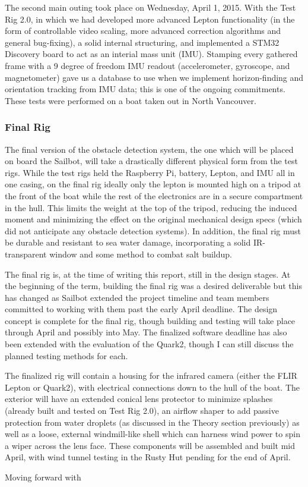 The second main outing took place on Wednesday, April 1, 2015. With the Test Rig 2.0, in which we had developed more advanced Lepton functionality (in the form of controllable video scaling, more advanced correction algorithms and general bug-fixing), a solid internal structuring, and implemented a STM32 Discovery board to act as an interial mass unit (IMU). Stamping every gathered frame with a 9 degree of freedom IMU readout (accelerometer, gyroscope, and magnetometer) gave us a database to use when we implement horizon-finding and orientation tracking from IMU data; this is one of the ongoing commitments. These tests were performed on a boat taken out in North Vancouver.


\subsubsection{\label{sec:discussion:testing:testrig3}Final Rig}
The final version of the obstacle detection system, the one which will be placed on board the Sailbot, will take a drastically different physical form from the test rigs. While the test rigs held the Raspberry Pi, battery, Lepton, and IMU all in one casing, on the final rig ideally only the lepton is mounted high on a tripod at the front of the boat while the rest of the electronics are in a secure compartment in the hull. This limits the weight at the top of the tripod, reducing the induced moment and minimizing the effect on the original mechanical design specs (which did not anticipate any obstacle detection systems). In addition, the final rig must be durable and resistant to sea water damage, incorporating a solid IR-transparent window and some method to combat salt buildup. 

The final rig is, at the time of writing this report, still in the design stages. At the beginning of the term, building the final rig was a desired deliverable but this has changed as Sailbot extended the project timeline and team members committed to working with them past the early April deadline. The design concept is complete for the final rig, though building and testing will take place through April and possibly into May. The finalized software deadline has also been extended with the evaluation of the Quark2, though I can still discuss the planned testing methods for each.

The finalized rig will contain a housing for the infrared camera (either the FLIR Lepton or Quark2), with electrical connections down to the hull of the boat. The exterior will have an extended conical lens protector to minimize splashes (already built and tested on Test Rig 2.0), an airflow shaper to add passive protection from water droplets (as discussed in the Theory section previously) as well as a loose, external windmill-like shell which can harness wind power to spin a wiper across the lens face. These components will be assembled and built mid April, with wind tunnel testing in the Rusty Hut pending for the end of April.

Moving forward with 
